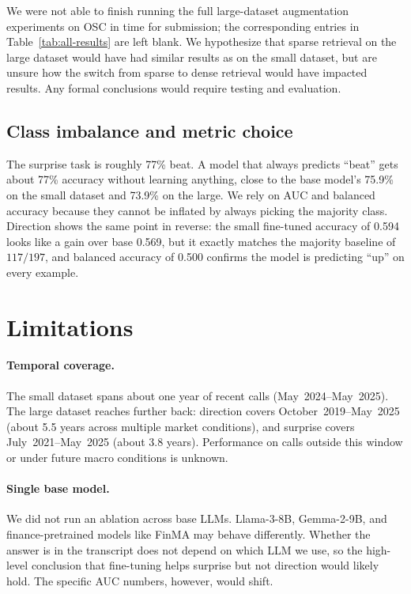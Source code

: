 \documentclass[11pt]{article}
\begin{document}
We were not able to finish running the full large-dataset augmentation
experiments on OSC in time for submission; the corresponding entries
in Table~\ref{tab:all-results} are left blank. We hypothesize that sparse retrieval on the large dataset would have had similar results as on the small dataset, but are unsure how the switch from sparse to dense retrieval would have impacted results. Any formal conclusions would require testing and evaluation.

\subsection{Class imbalance and metric choice}

The surprise task is roughly 77\% beat. A model that always
predicts ``beat'' gets about 77\% accuracy without learning
anything, close to the base model's 75.9\% on the small dataset and
73.9\% on the large. We rely on AUC and balanced accuracy because
they cannot be inflated by always picking the majority class.
Direction shows the same point in reverse: the small fine-tuned
accuracy of 0.594 looks like a gain over base 0.569, but it exactly
matches the majority baseline of $117/197$, and balanced accuracy
of 0.500 confirms the model is predicting ``up'' on every example.

\section{Limitations}

\paragraph{Temporal coverage.}
The small dataset spans about one year of recent calls
(May~2024--May~2025). The large dataset reaches further back:
direction covers October~2019--May~2025 (about 5.5 years across
multiple market conditions), and surprise covers July~2021--May~2025
(about 3.8 years). Performance on calls outside this window or
under future macro conditions is unknown.

\paragraph{Single base model.}
We did not run an ablation across base LLMs. Llama-3-8B,
Gemma-2-9B, and finance-pretrained models like FinMA may behave
differently. Whether the answer is in the transcript does not
depend on which LLM we use, so the high-level conclusion that
fine-tuning helps surprise but not direction would likely hold.
The specific AUC numbers, however, would shift.
\end{document}
